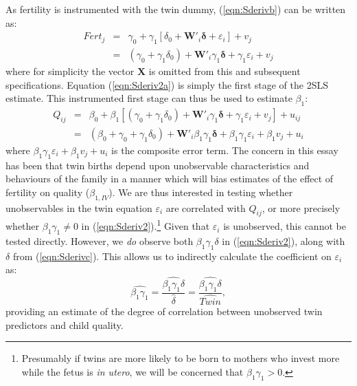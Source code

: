 \documentclass{article}[11pt,subeqn]
\newcommand{\vect}[1]{\mathbf{#1}}
\begin{document}
\begin{spacing}{1.5}
As fertility is instrumented with the twin dummy, (\ref{eqn:Sderivb}) can be written as:
\begin{eqnarray}
Fert_{j}&=&\gamma_0+\gamma_1[\delta_0+\vect{W}'_i\vect{\delta}+\varepsilon_i]+v_{j}  \nonumber \\
&=& (\gamma_0+ \gamma_1\delta_0)+\vect{W}'_i\gamma_1\vect{\delta}+\gamma_1\varepsilon_i+v_{j} \label{eqn:Sderiv2a}
\end{eqnarray}
where for simplicity the vector $\vect{X}$ is omitted from this and subsequent specifications.  Equation (\ref{eqn:Sderiv2a}) is simply the first 
stage of the 2SLS estimate.  This instrumented first stage can thus be used to estimate $\beta_1$:
\begin{eqnarray}
Q_{ij}&=&\beta_0+\beta_1[(\gamma_0+ \gamma_1\delta_0)+\vect{W}'_i\gamma_1\vect{\delta}+\gamma_1\varepsilon_i+v_{j}]+u_{ij} \nonumber \\
&=& (\beta_0+\gamma_0+ \gamma_1\delta_0)+\vect{W}'_i\beta_1\gamma_1\vect{\delta}+\beta_1\gamma_1\varepsilon_i+\beta_1v_{j}+u_i \label{eqn:Sderiv2}
\end{eqnarray}
where $\beta_1\gamma_1\varepsilon_i+\beta_1v_{j}+u_i$ is the composite error term.  The concern in this essay has been that twin
births depend upon unobservable characteristics and behaviours of the family in a manner which will bias estimates of the effect of fertility on 
quality ($\beta_{1,IV}$).
We are thus interested in testing whether unobservables in the twin equation $\varepsilon_i$ are correlated with $Q_{ij}$, or more precisely
whether $\beta_1\gamma_1\neq 0$ in (\ref{eqn:Sderiv2}).\footnote{Presumably if twins are more likely to be born to mothers who
invest more while the fetus is \emph{in utero}, we will be concerned that $\beta_1\gamma_1> 0$.}  Given that $\varepsilon_i$ is unobserved,
this cannot be tested directly.  However, we \emph{do} observe both $\beta_1\gamma_1\delta$ in (\ref{eqn:Sderiv2}), along with $\delta$ from
(\ref{eqn:Sderivc}).  This allows us to indirectly calculate the coefficient on $\varepsilon_i$ as:
\begin{equation}
\label{eqn:Sderiv3}
\widehat{\beta_1\gamma_1}=\frac{\widehat{\beta_1\gamma_1\delta}}{\hat{\delta}}=\frac{\widehat{\beta_1\gamma_1\delta}}{\widehat{Twin}},
\end{equation}
providing an estimate of the degree of correlation between unobserved twin predictors and child quality.

\end{spacing}
\end{document}
